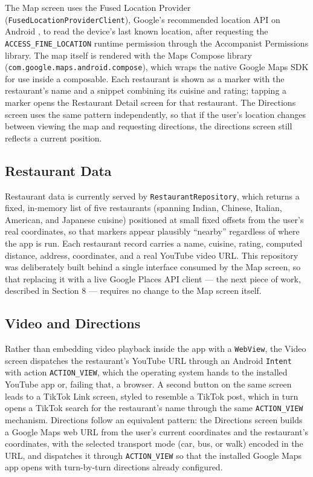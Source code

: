 \documentclass[12pt, a4paper]{article}
\begin{document}
The Map screen uses the Fused Location Provider (\texttt{FusedLocationProviderClient}), Google's recommended location API on Android \citep{android_location}, to read the device's last known location, after requesting the \texttt{ACCESS\_FINE\_LOCATION} runtime permission through the Accompanist Permissions library. The map itself is rendered with the Maps Compose library (\texttt{com.google.maps.android.compose}), which wraps the native Google Maps SDK for use inside a composable. Each restaurant is shown as a marker with the restaurant's name and a snippet combining its cuisine and rating; tapping a marker opens the Restaurant Detail screen for that restaurant. The Directions screen uses the same pattern independently, so that if the user's location changes between viewing the map and requesting directions, the directions screen still reflects a current position.

\subsection{Restaurant Data}

Restaurant data is currently served by \texttt{RestaurantRepository}, which returns a fixed, in-memory list of five restaurants (spanning Indian, Chinese, Italian, American, and Japanese cuisine) positioned at small fixed offsets from the user's real coordinates, so that markers appear plausibly ``nearby'' regardless of where the app is run. Each restaurant record carries a name, cuisine, rating, computed distance, address, coordinates, and a real YouTube video URL. This repository was deliberately built behind a single interface consumed by the Map screen, so that replacing it with a live Google Places API client — the next piece of work, described in Section 8 — requires no change to the Map screen itself.

\subsection{Video and Directions}

Rather than embedding video playback inside the app with a \texttt{WebView}, the Video screen dispatches the restaurant's YouTube URL through an Android \texttt{Intent} with action \texttt{ACTION\_VIEW}, which the operating system hands to the installed YouTube app or, failing that, a browser. A second button on the same screen leads to a TikTok Link screen, styled to resemble a TikTok post, which in turn opens a TikTok search for the restaurant's name through the same \texttt{ACTION\_VIEW} mechanism. Directions follow an equivalent pattern: the Directions screen builds a Google Maps web URL from the user's current coordinates and the restaurant's coordinates, with the selected transport mode (car, bus, or walk) encoded in the URL, and dispatches it through \texttt{ACTION\_VIEW} so that the installed Google Maps app opens with turn-by-turn directions already configured.
\end{document}
